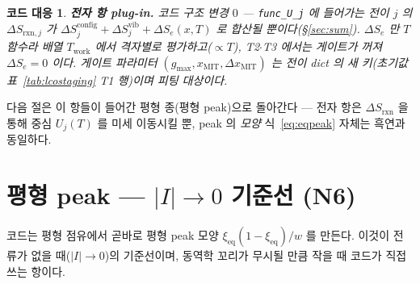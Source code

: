 \documentclass[11pt,a4paper]{article}
\newtheorem*{codebox}{코드 대응}
\newcommand{\eq}{\mathrm{eq}}
\newcommand{\rxn}{\mathrm{rxn}}
\newcommand{\work}{\mathrm{work}}
\newcommand{\config}{\mathrm{config}}
\newcommand{\vib}{\mathrm{vib}}
\newcommand{\MIT}{\mathrm{MIT}}
\newcommand{\code}[1]{\texttt{#1}}
\begin{document}
\begin{codebox}
\textbf{전자 항 plug-in.} 코드 구조 변경 $0$ — \code{func\_U\_j} 에 들어가는 전이 $j$ 의 $\Delta S_{\rxn,j}$ 가
$\Delta S^\config_j+\Delta S^\vib_j+\Delta S_e(x,T)$ 로 합산될 뿐이다(\S\ref{sec:sum}). $\Delta S_e$ 만 $T$ 함수라
배열 $T_\work$ 에서 격자별로 평가하고($\propto T$), T2$\cdot$T3 에서는 게이트가 꺼져 $\Delta S_e=0$ 이다. 게이트
파라미터 $(g_{\max},x_\MIT,\Delta x_\MIT)$ 는 전이 dict 의 새 키(초기값 표~\ref{tab:lcostaging} T1 행)이며 피팅 대상이다.
\end{codebox}

다음 절은 이 항들이 들어간 평형 종(평형 peak)으로 돌아간다 — 전자 항은 $\Delta S_{\rxn}$ 을 통해 중심 $U_j(T)$ 를 미세
이동시킬 뿐, peak 의 \emph{모양} 식~\eqref{eq:eqpeak} 자체는 흑연과 동일하다.

\section{평형 peak — $|I|\to0$ 기준선 (N6)}\label{sec:eqpeak}
코드는 평형 점유에서 곧바로 평형 peak 모양 $\xi_\eq(1-\xi_\eq)/w$ 를 만든다. 이것이 전류가 없을 때($|I|\to0$)의
기준선이며, 동역학 꼬리가 무시될 만큼 작을 때 코드가 직접 쓰는 항이다.
\end{document}
